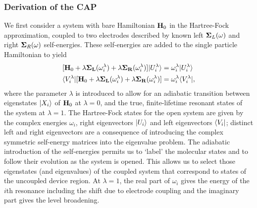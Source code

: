 \subsubsection{Derivation of the \ac{CAP}}
We first consider a system with bare Hamiltonian $\mathbf{H}_0$ in the
Hartree-Fock approximation, coupled to two electrodes described by known
left $\mathbf{\Sigma}_L(\omega)$ and right $\mathbf{\Sigma}_R(\omega)$ self-energies.
These self-energies are added to the single particle
Hamiltonian to yield
\begin{eqnarray}
\label{eq:capseq}
        [\mathbf{H}_0 + \lambda \mathbf{\Sigma_L}(\omega_i^\lambda)
            +\lambda \mathbf{\Sigma_R}(\omega_i^\lambda)] |U_i^\lambda \rangle
        &= \omega_i^\lambda |U_i^\lambda \rangle \\
        \langle V_i^\lambda| [\mathbf{H}_0 + \lambda \mathbf{\Sigma_L}(\omega_i^\lambda)
            +\lambda \mathbf{\Sigma_R}(\omega_i^\lambda)]
        &= \omega_i^\lambda \langle V_i^\lambda|,
        \label{eq:adiabaticap}
\end{eqnarray}
where the parameter $\lambda$ is introduced to allow for an adiabatic
transition between eigenstates $|X_i \rangle$ of $\mathbf{H}_0$ at $\lambda = 0$,
and the true, finite-lifetime resonant states of the system at
$\lambda = 1$. The Hartree-Fock states for the open system are given by
the complex energies $\omega_i$, right eigenvectors $|U_i \rangle$ and left
eigenvectors $\langle V_i|$; distinct left and right eigenvectors are a
consequence of introducing the complex symmetric self-energy matrices into
the eigenvalue problem.
The adiabatic introduction of the self-energies permits
us to `label' the molecular states and to follow their evolution as the
system is opened. This allows us to select those eigenstates (and
eigenvalues) of the coupled system that correspond to states of the
uncoupled device region. At $\lambda=1$, the real part of $\omega_i$
gives the energy of the $i$th resonance including the shift due to
electrode coupling and the imaginary part gives the level broadening.

